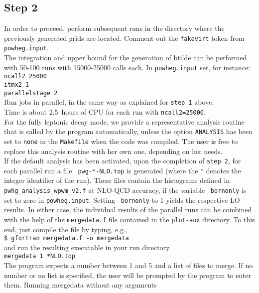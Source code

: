 \documentclass[a4paper,11pt]{article}
\begin{document}
\subsection*{Step 2}
%
In order to proceed, perform subsequent runs in the directory where the previously generated grids are located.
%
Comment out the {\tt fakevirt} token from {\tt powheg.input}. 
\\[2ex]
The integration and upper bound for the generation of btilde can be
performed with 50-100 runs with 15000-25000 calls each. In {\tt powheg.input} set, for instance:
\\[2ex]
{\tt ncall2 25000}
\\
{\tt itmx2 1}
\\
{\tt parallelstage  2}
\\[2ex]
Run jobs in parallel, in the same way as explained for {\tt step 1} above. 
\\[2ex]
Time is about 2.5~hours of CPU for each run with {\tt ncall2=25000}.
\\[2ex]
For the fully leptonic decay mode, we provide a representative analysis routine that is called by the program automatically, unless the option {\tt ANALYSIS} has been set to {\tt none} in the {\tt Makefile} when the code was compiled. The user is free to replace this analysis routine with her own one, depending on her needs.  
\\[2ex]
If the default analysis has been activated, upon the completion of {\tt step 2}, for each parallel run a file {\tt
  pwg-*-NLO.top} is generated (where the * denotes the integer
identifier of the run).  These files contain the histograms defined in
{\tt pwhg\_analysis\_wpwm\_v2.f} at NLO-QCD accuracy, if the variable {\tt
  bornonly} is set to zero in {\tt powheg.input}.  Setting {\tt
  bornonly} to 1 yields the respective LO results. In either case, the
individual results of the parallel runs can be combined with the help
of the {\tt mergedata.f} file contained in the {\tt plot-aux}
directory.  To this end, just compile the file by typing, e.g.,
\\[2ex]
{\tt \$ gfortran mergedata.f -o mergedata}
\\[2ex]
and run the resulting executable in your run directory
\\[2ex]
{\tt mergedata 1 *NLO.top}
\\[2ex]
The program expects a number between 1 and 5 and a list of files to
merge. If no number or no list is specified, the user will be prompted
by the program to enter them. Running mergedata without any arguments
\end{document}
